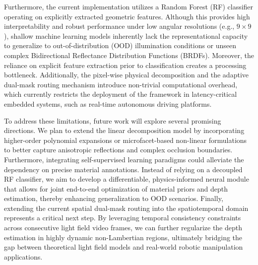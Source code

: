 \documentclass[lettersize,journal]{IEEEtran}
\begin{document}
Furthermore, the current implementation utilizes a Random Forest (RF) classifier operating on explicitly extracted geometric features. Although this provides high interpretability and robust performance under low angular resolutions (e.g., $9 \times 9$), shallow machine learning models inherently lack the representational capacity to generalize to out-of-distribution (OOD) illumination conditions or unseen complex Bidirectional Reflectance Distribution Functions (BRDFs). Moreover, the reliance on explicit feature extraction prior to classification creates a processing bottleneck. Additionally, the pixel-wise physical decomposition and the adaptive dual-mask routing mechanism introduce non-trivial computational overhead, which currently restricts the deployment of the framework in latency-critical embedded systems, such as real-time autonomous driving platforms.

To address these limitations, future work will explore several promising directions. We plan to extend the linear decomposition model by incorporating higher-order polynomial expansions or microfacet-based non-linear formulations to better capture anisotropic reflections and complex occlusion boundaries. Furthermore, integrating self-supervised learning paradigms could alleviate the dependency on precise material annotations. Instead of relying on a decoupled RF classifier, we aim to develop a differentiable, physics-informed neural module that allows for joint end-to-end optimization of material priors and depth estimation, thereby enhancing generalization to OOD scenarios. Finally, extending the current spatial dual-mask routing into the spatiotemporal domain represents a critical next step. By leveraging temporal consistency constraints across consecutive light field video frames, we can further regularize the depth estimation in highly dynamic non-Lambertian regions, ultimately bridging the gap between theoretical light field models and real-world robotic manipulation applications.



\end{document}
